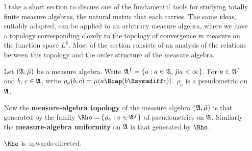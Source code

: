 
\def\chaptername{Measure algebras}
\def\sectionname{The topology of a measure algebra}


I take a short section to discuss one of the fundamental tools for
studying totally finite measure algebras, the natural metric that each
carries.   The same ideas, suitably adapted, can be applied to an
arbitrary
measure algebra, where we have a topology corresponding closely to the
topology of convergence in measure on the function space $L^0$.   Most
of the section consists of an analysis of the relations between this
topology and the order structure of the measure algebra.

 Let $(\frak A,\bar\mu)$ be
a measure algebra.   Write $\frak A^f=\{a:a\in\frak A,\,\bar\mu
a<\infty\}$.   For $a\in\frak A^f$ and $b$, $c\in\frak A$, write
$\rho_a(b,c)=\bar\mu(a\Bcap(b\Bsymmdiff c))$.
 $\rho_a$ is a pseudometric on $\frak A$.

 Now the {\bf measure-algebra topology} of the
measure algebra $(\frak A,\bar\mu)$ is that generated by the family
$\Rho=\{\rho_a:a\in\frak A^f\}$ of pseudometrics on $\frak A$.
Similarly the {\bf measure-algebra uniformity} on $\frak A$ is that
generated by $\Rho$.   


 $\Rho$ is
upwards-directed.

